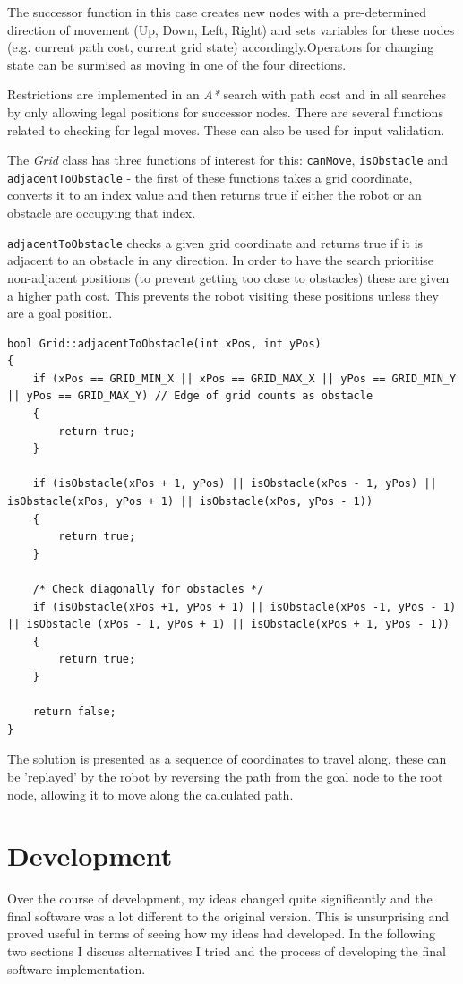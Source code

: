 \documentclass[a4paper,12pt]{article}
\begin{document}
The successor function in this case creates new nodes with a pre-determined direction of movement (Up, Down, Left, Right) and sets variables for these nodes (e.g. current path cost, current grid state) accordingly.Operators for changing state can be surmised as moving in one of the four directions. 

Restrictions are implemented in an \textit{A*} search with path cost and in all searches by only allowing legal positions for successor nodes. There are several functions related to checking for legal moves. These can also be used for input validation.

The \textit{Grid} class has three functions of interest for this: \texttt{canMove}, \texttt{isObstacle} and \texttt{adjacentToObstacle} - the first of these functions takes a grid coordinate, converts it to an index value and then returns true if either the robot or an obstacle are occupying that index.

\texttt{adjacentToObstacle} checks a given grid coordinate and returns true if it is adjacent to an obstacle in any direction. In order to have the search prioritise non-adjacent positions (to prevent getting too close to obstacles) these are given a higher path cost. This prevents the robot visiting these positions unless they are a goal position.

\begin{lstlisting}
bool Grid::adjacentToObstacle(int xPos, int yPos)
{
    if (xPos == GRID_MIN_X || xPos == GRID_MAX_X || yPos == GRID_MIN_Y || yPos == GRID_MAX_Y) // Edge of grid counts as obstacle
    {
        return true;
    }

    if (isObstacle(xPos + 1, yPos) || isObstacle(xPos - 1, yPos) || isObstacle(xPos, yPos + 1) || isObstacle(xPos, yPos - 1))
    {
        return true;
    }

    /* Check diagonally for obstacles */
    if (isObstacle(xPos +1, yPos + 1) || isObstacle(xPos -1, yPos - 1) || isObstacle (xPos - 1, yPos + 1) || isObstacle(xPos + 1, yPos - 1))
    {
        return true;
    }

    return false;
}
\end{lstlisting}

The solution is presented as a sequence of coordinates to travel along, these can be 'replayed' by the robot by reversing the path from the goal node to the root node, allowing it to move along the calculated path.
\section{Development}
Over the course of development, my ideas changed quite significantly and the final software was a lot different to the original version. This is unsurprising and proved useful in terms of seeing how my ideas had developed. In the following two sections I discuss alternatives I tried and the process of developing the final software implementation.
\end{document}
